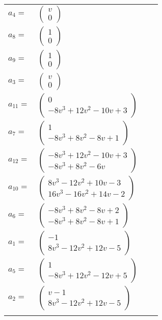 \documentclass[1p]{elsarticle_modified}
\theoremstyle{definition}
\begin{document}
\begin{tabular}{m{7pt} m{180pt} m{7pt} m{180pt} }
\flushright $a_{4}=$&$\begin{pmatrix}v\\0\end{pmatrix}$ \\
\flushright $a_{8}=$&$\begin{pmatrix}1\\0\end{pmatrix}$ \\
\flushright $a_{9}=$&$\begin{pmatrix}1\\0\end{pmatrix}$ \\
\flushright $a_{3}=$&$\begin{pmatrix}v\\0\end{pmatrix}$ \\
\flushright $a_{11}=$&$\begin{pmatrix}0\\-8 v^3+12 v^2-10 v+3\end{pmatrix}$ \\
\flushright $a_{7}=$&$\begin{pmatrix}1\\-8 v^3+8 v^2-8 v+1\end{pmatrix}$ \\
\flushright $a_{12}=$&$\begin{pmatrix}-8 v^3+12 v^2-10 v+3\\-8 v^3+8 v^2-6 v\end{pmatrix}$ \\
\flushright $a_{10}=$&$\begin{pmatrix}8 v^3-12 v^2+10 v-3\\16 v^3-16 v^2+14 v-2\end{pmatrix}$ \\
\flushright $a_{6}=$&$\begin{pmatrix}-8 v^3+8 v^2-8 v+2\\-8 v^3+8 v^2-8 v+1\end{pmatrix}$ \\
\flushright $a_{1}=$&$\begin{pmatrix}-1\\8 v^3-12 v^2+12 v-5\end{pmatrix}$ \\
\flushright $a_{5}=$&$\begin{pmatrix}1\\-8 v^3+12 v^2-12 v+5\end{pmatrix}$ \\
\flushright $a_{2}=$&$\begin{pmatrix}v-1\\8 v^3-12 v^2+12 v-5\end{pmatrix}$\\&\end{tabular}
\end{document}
